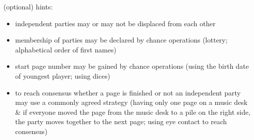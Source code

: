 \documentclass[12pt,a4paper,ngerman]{article}
\begin{document}
\vspace{1.5cm}




\newpage

\begin{minipage}[b]{.7\textwidth}

\vspace{1.5cm}
\begin{footnotesize}

    {\small (optional) hints:}

    \begin{itemize}

        \item{independent parties may or may not be displaced from each other}

        \item{membership of parties may be declared by chance operations (lottery; alphabetical order of first names)}

        \item{start page number may be gained by chance operations (using the birth date of youngest player; using dices)}

        \item{
                to reach consensus whether a page is finished or not an independent party may use a commonly agreed strategy %
                (having only one page on a music desk \& if everyone moved the page from the music desk to a pile on the right side, the party moves together to the next page;
                using eye contact to reach consensus)
            }

    \end{itemize}

\end{footnotesize}


\end{minipage}%




% 
% 
% 
\end{document}
